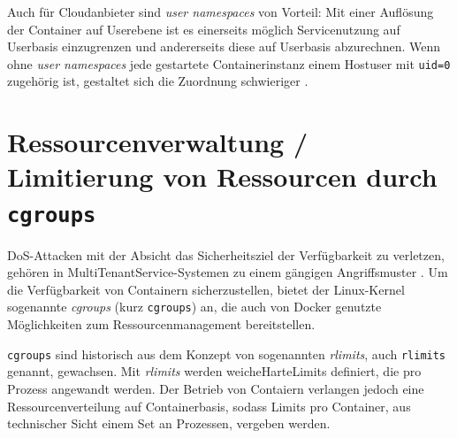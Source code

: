 \documentclass[../main.tex]{subfiles}
\begin{document}


			Auch für Cloudanbieter sind \emph{user namespaces} von Vorteil: Mit einer Auflösung der Container auf Userebene ist es einerseits möglich Servicenutzung auf Userbasis einzugrenzen und andererseits diese auf Userbasis abzurechnen. Wenn ohne \emph{user namespaces} jede gestartete Containerinstanz einem Hostuser mit \texttt{uid=0} zugehörig ist, gestaltet sich die Zuordnung schwieriger \cite[S.3]{nsUserContainerCon}.
	\section{Ressourcenverwaltung / Limitierung von Ressourcen durch \texttt{\acrshort{cgroups}}}
  \label{secResLimit}
		\acrshort{DoS}-Attacken mit der Absicht das Sicherheitsziel der Verfügbarkeit zu verletzen, gehören in \gls{MultiTenantService}-Systemen zu einem gängigen Angriffsmuster \cite[S.5]{dockerSec1}. Um die Verfügbarkeit von Containern sicherzustellen, bietet der Linux-Kernel sogenannte \emph{\acrlong{cgroups}} (kurz \texttt{\acrshort{cgroups}}) an, die auch von Docker genutzte Möglichkeiten zum Ressourcenmanagement bereitstellen.



		\texttt{\acrshort{cgroups}} sind historisch aus dem Konzept von sogenannten \emph{\acrlong{rlimits}}, auch \texttt{\acrshort{rlimits}} genannt, gewachsen. Mit \emph{rlimits} werden \gls{weicheHarteLimits} definiert, die pro Prozess angewandt werden. Der Betrieb von Contaiern verlangen jedoch eine Ressourcenverteilung auf Containerbasis, sodass Limits pro Container, aus technischer Sicht einem Set an Prozessen, vergeben werden.
\end{document}
